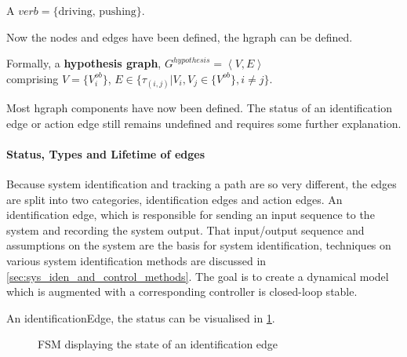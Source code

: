 A $verb = \{\textrm{driving, pushing}\}$.\bs

Now the nodes and edges have been defined, the \ac{hgraph} can be defined.\bs

Formally, a \textbf{hypothesis graph}, $G^{hypothesis} = \left\langle V, E \right\rangle $ 
\\comprising $V = \{V^{ob}_{i}\}$, \quad $E \in \{\tau_{(i,j)}| V_i, V_j \in \{V^{ob} \}, i \neq j\}$.\bs

Most \ac{hgraph} components have now been defined. The status of an identification edge or action edge still remains undefined and requires some further explanation.\bs

\paragraph{Status, Types and Lifetime of edges}
Because system identification and tracking a path are so very different, the edges are split into two categories, identification edges and action edges. An identification edge, which is responsible for sending an input sequence to the system and recording the system output. That input/output sequence and assumptions on the system are the basis for system identification, techniques on various system identification methods are discussed in \cref{sec:sys_iden_and_control_methods}. The goal is to create a dynamical model which is augmented with a corresponding controller is closed-loop stable.\bs

An identificationEdge, the status can be visualised in \cref{tikz:status_identification_edge}.\bs

\begin{figure}[H]
\centering
{}
\caption{\acs{FSM} displaying the state of an identification edge}%
\label{tikz:status_identification_edge}
\end{figure}

